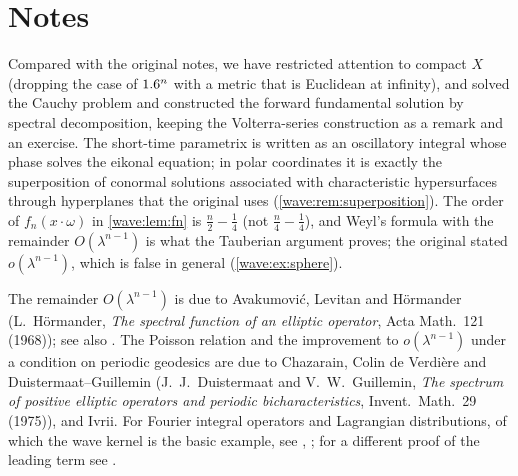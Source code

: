 \section*{Notes}

Compared with the original notes, we have restricted attention to compact $X$
(dropping the case of $1.6^n$ with a metric that is Euclidean at infinity), and solved
the Cauchy problem and constructed the forward fundamental solution by spectral
decomposition, keeping the Volterra-series construction as a remark and an exercise.
The short-time parametrix is written as an oscillatory integral whose phase solves
the eikonal equation; in polar coordinates it is exactly the superposition of
conormal solutions associated with characteristic hypersurfaces through hyperplanes
that the original uses (\cref{wave:rem:superposition}). The order of $f_n(x\cdot\omega)$ in
\cref{wave:lem:fn} is $\frac n2-\frac14$ (not $\frac n4-\frac14$), and Weyl's formula with the
remainder $O(\lambda^{n-1})$ is what the Tauberian argument proves; the original stated
$o(\lambda^{n-1})$, which is false in general (\cref{wave:ex:sphere}).

The remainder $O(\lambda^{n-1})$ is due to Avakumovi\'c, Levitan and H\"ormander
(L.~H\"ormander, \emph{The spectral function of an elliptic operator}, Acta Math.\ 121
(1968)); see also \cite[Section~17.5]{Hormander-III}. The Poisson relation and the
improvement to $o(\lambda^{n-1})$ under a condition on periodic geodesics are due to
Chazarain, Colin de Verdi\`ere and Duistermaat--Guillemin (J.~J.~Duistermaat and
V.~W.~Guillemin, \emph{The spectrum of positive elliptic operators and periodic
bicharacteristics}, Invent.\ Math.\ 29 (1975)), and Ivrii. For Fourier integral operators
and Lagrangian distributions, of which the wave kernel is the basic example, see
\cite{Hormander-FIO}, \cite{Bruning-Guillemin}; for a different proof of the leading term
see \cite{Guillemin-Weyl}.
